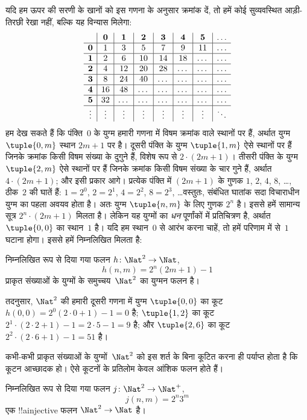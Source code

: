 \documentclass[../../../include/open-logic-section]{subfiles}
\begin{document}
\begin{explain}
\[\]
यदि हम ऊपर की सरणी के खानों को इस गणना के अनुसार क्रमांक दें, तो हमें कोई
सुव्यवस्थित आड़ी-तिरछी रेखा नहीं, बल्कि यह विन्यास मिलेगा:
\[
\begin{array}{ c | c | c | c | c | c | c | c }
& \mathbf 0 & \mathbf 1 & \mathbf 2 & \mathbf 3 & \mathbf 4 & \mathbf 5 & \dots \\
\hline
\mathbf 0 & 1 & 3 & 5 & 7 & 9 & 11 & \dots \\
\hline
\mathbf 1 & 2 & 6 & 10 & 14 & 18 & \dots & \dots \\
\hline
\mathbf 2 & 4 & 12 & 20 & 28 & \dots & \dots & \dots \\
\hline
\mathbf 3 & 8 & 24 & 40 & \dots & \dots & \dots & \dots \\
\hline
\mathbf 4 & 16 & 48 & \dots & \dots & \dots & \dots & \dots \\
\hline
\mathbf 5 & 32 & \dots & \dots & \dots & \dots & \dots & \dots \\
\hline
\vdots & \vdots & \vdots & \vdots & \vdots & \vdots & \vdots & \ddots\\
\end{array}
\]
हम देख सकते हैं कि पंक्ति~$0$ के युग्म हमारी गणना में विषम क्रमांक वाले
स्थानों पर हैं, अर्थात युग्म $\tuple{0,m}$ स्थान $2m+1$ पर है। दूसरी पंक्ति
के युग्म $\tuple{1,m}$ ऐसे स्थानों पर हैं जिनके क्रमांक किसी विषम संख्या के
दुगुने हैं, विशेष रूप से $2 \cdot (2m+1)$। तीसरी पंक्ति के युग्म
$\tuple{2,m}$ ऐसे स्थानों पर हैं जिनके क्रमांक किसी विषम संख्या के चार गुने
हैं, अर्थात $4 \cdot (2m+1)$; और इसी प्रकार आगे। प्रत्येक पंक्ति में
$(2m+1)$ के गुणक $1$, $2$, $4$, $8$, \dots, ठीक~$2$ की घातें हैं:
$1= 2^0$, $2 = 2^1$, $4 = 2^2$, $8 = 2^3$, \dots\@ वस्तुतः, संबंधित
घातांक सदा विचाराधीन युग्म का पहला अवयव होता है। अतः युग्म $\tuple{n,m}$ के
लिए गुणक $2^n$ है। इससे हमें सामान्य सूत्र $2^n \cdot (2m+1)$ मिलता है।
लेकिन यह युग्मों का \emph{धन} पूर्णांकों में प्रतिचित्रण है, अर्थात
$\tuple{0,0}$ का स्थान~$1$ है। यदि हम स्थान~$0$ से आरंभ करना चाहें, तो हमें
परिणाम में से~$1$ घटाना होगा। इससे हमें निम्नलिखित मिलता है:
\end{explain}

\begin{ex}
निम्नलिखित रूप से दिया गया फलन $h\colon \Nat^2 \to \Nat$,
\[
h(n,m) = 2^n (2m+1) - 1
\]
प्राकृत संख्याओं के युग्मों के समुच्चय~$\Nat^2$ का युग्मन फलन है।
\end{ex}

\begin{explain}
तदनुसार, $\Nat^2$ की हमारी दूसरी गणना में युग्म $\tuple{0,0}$ का कूट
$h(0,0) = 2^0(2\cdot 0+1) - 1 = 0$ है; $\tuple{1,2}$ का कूट
$2^{1} \cdot (2 \cdot 2 + 1) - 1 = 2
\cdot 5 - 1 = 9$ है; और $\tuple{2,6}$ का कूट $2^{2} \cdot (2
\cdot 6 + 1) - 1 = 51$ है।
\end{explain}

कभी-कभी प्राकृत संख्याओं के युग्मों~$\Nat^2$ को इस शर्त के बिना कूटित करना
ही पर्याप्त होता है कि कूटन आच्छादक हो। ऐसे कूटनों के प्रतिलोम केवल आंशिक
फलन होते हैं।

\begin{ex}
निम्नलिखित रूप से दिया गया फलन $j\colon \Nat^2 \to \Nat^+$,
\[
j(n,m) = 2^n3^m
\]
एक !!a{injective} फलन $\Nat^2 \to \Nat$ है।
\end{ex}
\end{document}
